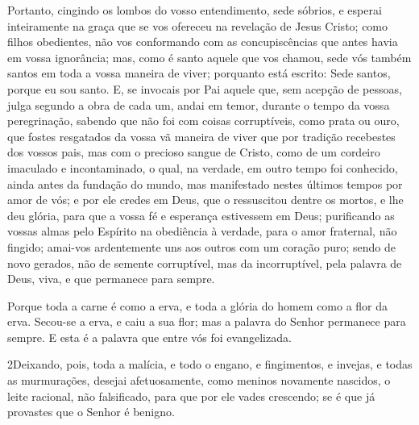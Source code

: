 Portanto, cingindo os lombos do vosso entendimento, sede sóbrios,
e esperai inteiramente na graça que se vos ofereceu na revelação de
Jesus Cristo; como filhos obedientes, não vos conformando com
as concupiscências que antes havia em vossa ignorância; mas,
como é santo aquele que vos chamou, sede vós também santos em toda a
vossa maneira de viver; porquanto está escrito: Sede santos,
porque eu sou santo. E, se invocais por Pai aquele que, sem
acepção de pessoas, julga segundo a obra de cada um, andai em temor,
durante o tempo da vossa peregrinação, sabendo que não foi
com coisas corruptíveis, como prata ou ouro, que fostes resgatados
da vossa vã maneira de viver que por tradição recebestes dos vossos
pais, mas com o precioso sangue de Cristo, como de um
cordeiro imaculado e incontaminado, o qual, na verdade, em
outro tempo foi conhecido, ainda antes da fundação do mundo, mas
manifestado nestes últimos tempos por amor de vós; e por ele
credes em Deus, que o ressuscitou dentre os mortos, e lhe deu
glória, para que a vossa fé e esperança estivessem em Deus;
purificando as vossas almas pelo Espírito na obediência à
verdade, para o amor fraternal, não fingido; amai-vos ardentemente
uns aos outros com um coração puro; sendo de novo gerados,
não de semente corruptível, mas da incorruptível, pela palavra de
Deus, viva, e que permanece para sempre.

Porque toda a carne é como a erva, e toda a glória do homem como
a flor da erva. Secou-se a erva, e caiu a sua flor; mas a
palavra do Senhor permanece para sempre. E esta é a palavra que
entre vós foi evangelizada.

\medskip

\lettrine{2} Deixando, pois, toda a malícia, e todo o engano,
e fingimentos, e invejas, e todas as murmurações, desejai
afetuosamente, como meninos novamente nascidos, o leite racional,
não falsificado, para que por ele vades crescendo; se é que já
provastes que o Senhor é benigno.

